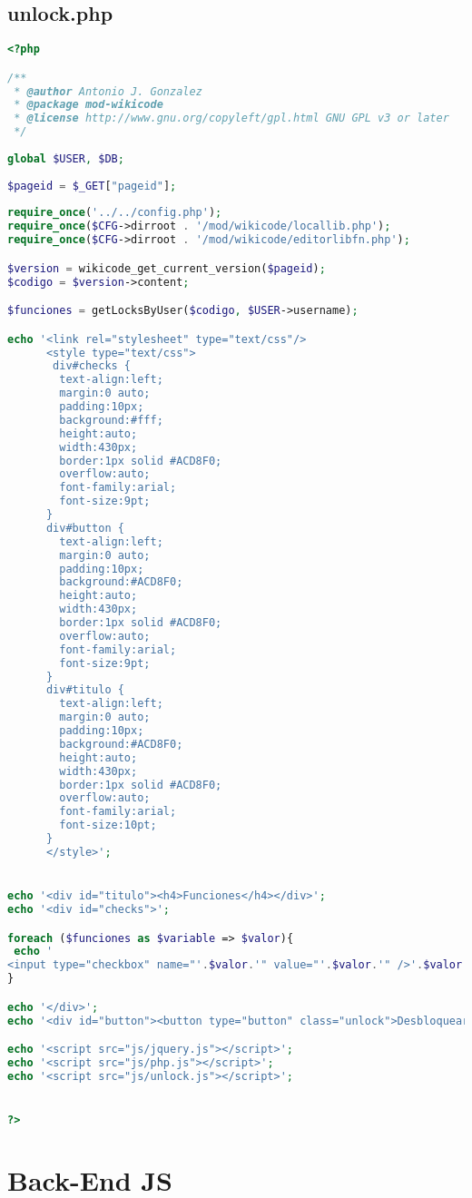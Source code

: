 \subsection{unlock.php}
\begin{lstlisting}[language=PHP]
<?php

/**
 * @author Antonio J. Gonzalez
 * @package mod-wikicode
 * @license http://www.gnu.org/copyleft/gpl.html GNU GPL v3 or later
 */
 
global $USER, $DB;
 
$pageid = $_GET["pageid"];
 
require_once('../../config.php');
require_once($CFG->dirroot . '/mod/wikicode/locallib.php');
require_once($CFG->dirroot . '/mod/wikicode/editorlibfn.php');

$version = wikicode_get_current_version($pageid);
$codigo = $version->content;

$funciones = getLocksByUser($codigo, $USER->username);

echo '<link rel="stylesheet" type="text/css"/>
      <style type="text/css">
       div#checks {
        text-align:left;
		margin:0 auto;
		padding:10px;
		background:#fff;
		height:auto;
		width:430px;
		border:1px solid #ACD8F0;
		overflow:auto;
		font-family:arial;
		font-size:9pt;
      }
      div#button {
        text-align:left;
		margin:0 auto;
		padding:10px;
		background:#ACD8F0;
		height:auto;
		width:430px;
		border:1px solid #ACD8F0;
		overflow:auto;
		font-family:arial;
		font-size:9pt;
      }
      div#titulo {
        text-align:left;
		margin:0 auto;
		padding:10px;
		background:#ACD8F0;
		height:auto;
		width:430px;
		border:1px solid #ACD8F0;
		overflow:auto;
		font-family:arial;
		font-size:10pt;
      }
      </style>';


echo '<div id="titulo"><h4>Funciones</h4></div>';
echo '<div id="checks">';

foreach ($funciones as $variable => $valor){
 echo '
<input type="checkbox" name="'.$valor.'" value="'.$valor.'" />'.$valor.'</br>';
} 

echo '</div>';
echo '<div id="button"><button type="button" class="unlock">Desbloquear</button>    <button type="cancel" class="cancelUnlock">Cancelar</button></div>';

echo '<script src="js/jquery.js"></script>';
echo '<script src="js/php.js"></script>';
echo '<script src="js/unlock.js"></script>';


?>
\end{lstlisting}


\section{Back-End JS}


